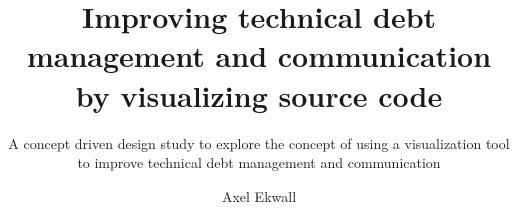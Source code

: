 \documentclass[sigchi, nonacm, balance=false, authorversion=true]{acmart}
\begin{document}
\title{Improving technical debt management and communication by visualizing source code}
\subtitle{A concept driven design study to explore the concept of using a visualization tool to improve technical debt management and communication}
\author{Axel Ekwall}




\maketitle














\appendix
\end{document}
